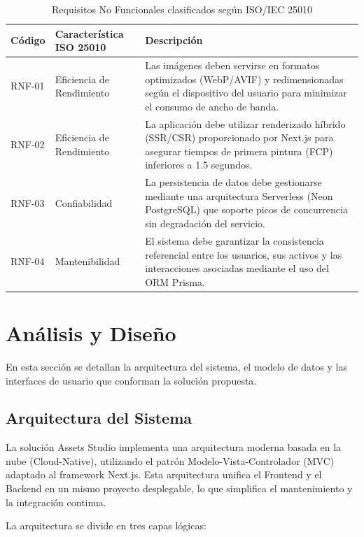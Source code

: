 \begin{table}[H]
\centering
\caption{Requisitos No Funcionales clasificados según ISO/IEC 25010}
\label{tab:rnf}
\begin{tabular}{llp{7cm}}
\hline
\textbf{Código} & \textbf{Característica ISO 25010} & \textbf{Descripción} \\
\hline
RNF-01 & Eficiencia de Rendimiento & Las imágenes deben servirse en formatos optimizados (WebP/AVIF) y redimensionadas según el dispositivo del usuario para minimizar el consumo de ancho de banda. \\
RNF-02 & Eficiencia de Rendimiento & La aplicación debe utilizar renderizado híbrido (SSR/CSR) proporcionado por Next.js para asegurar tiempos de primera pintura (FCP) inferiores a 1.5 segundos. \\
RNF-03 & Confiabilidad & La persistencia de datos debe gestionarse mediante una arquitectura Serverless (Neon PostgreSQL) que soporte picos de concurrencia sin degradación del servicio. \\
RNF-04 & Mantenibilidad & El sistema debe garantizar la consistencia referencial entre los usuarios, sus activos y las interacciones asociadas mediante el uso del ORM Prisma. \\
\hline
\end{tabular}
\end{table}

\section{Análisis y Diseño}
\label{sec:diseno}

En esta sección se detallan la arquitectura del sistema, el modelo de datos y las interfaces de usuario que conforman la solución propuesta.

\subsection{Arquitectura del Sistema}

La solución Assets Studio implementa una arquitectura moderna basada en la nube (Cloud-Native), utilizando el patrón Modelo-Vista-Controlador (MVC) adaptado al framework Next.js. Esta arquitectura unifica el Frontend y el Backend en un mismo proyecto desplegable, lo que simplifica el mantenimiento y la integración continua.

La arquitectura se divide en tres capas lógicas:

